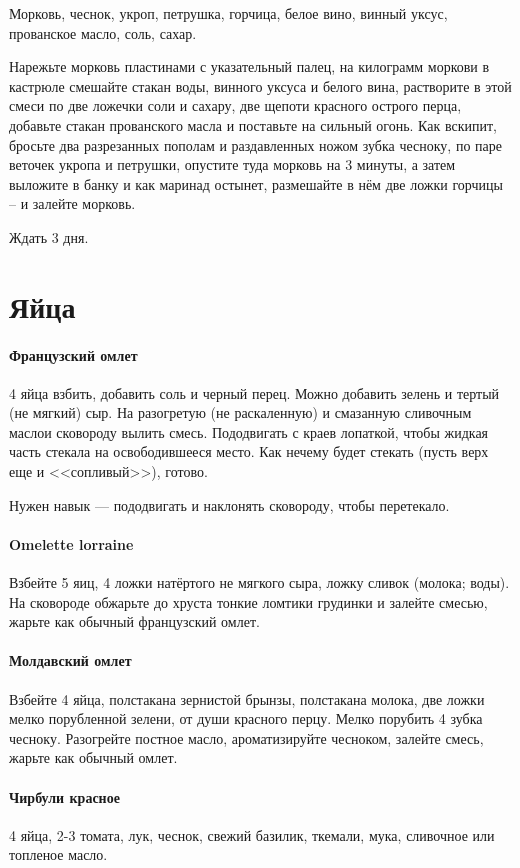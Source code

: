 \documentclass[11pt,a5paper]{article}
\begin{document}
Морковь, чеснок, укроп, петрушка, горчица, белое вино, винный уксус, прованское масло, соль, сахар.

Нарежьте морковь пластинами с указательный палец, на килограмм моркови в кастрюле смешайте стакан воды, винного уксуса и белого вина, растворите в этой смеси по две ложечки соли и сахару, две щепоти красного острого перца, добавьте стакан прованского масла и поставьте на сильный огонь. Как вскипит, бросьте два разрезанных пополам и раздавленных ножом зубка чесноку, по паре веточек укропа и петрушки, опустите туда морковь на 3 минуты, а затем выложите в банку и как маринад остынет, размешайте в нём две ложки горчицы -- и залейте морковь.

Ждать 3 дня.

\section{Яйца}

\paragraph{Французский омлет} %
4 яйца взбить, добавить соль и черный перец. Можно добавить зелень и тертый (не мягкий) сыр. На разогретую (не раскаленную) и смазанную сливочным маслои сковороду вылить смесь. Пододвигать с краев лопаткой, чтобы жидкая часть стекала на освободившееся место. Как нечему будет стекать (пусть верх еще и <<сопливый>>), готово.

Нужен навык --- пододвигать и наклонять сковороду, чтобы перетекало.

\paragraph{Omelette lorraine} %
Взбейте 5 яиц, 4 ложки натёртого не мягкого сыра, ложку сливок (молока; воды). На сковороде обжарьте до хруста тонкие ломтики грудинки и залейте смесью, жарьте как обычный французский омлет.

\paragraph{Молдавский омлет} %
Взбейте 4 яйца, полстакана зернистой брынзы, полстакана молока, две ложки мелко порубленной зелени, от души красного перцу. Мелко порубить 4 зубка чесноку. Разогрейте постное масло, ароматизируйте чесноком, залейте смесь, жарьте как обычный омлет.

\paragraph{Чирбули красное} %
4 яйца, 2-3 томата, лук, чеснок, свежий базилик, ткемали, мука, сливочное или топленое масло.
\end{document}
